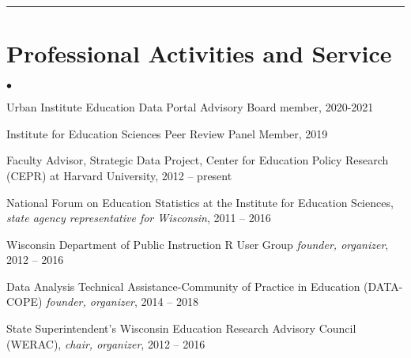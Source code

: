 \documentclass[margin,line]{res}
\newenvironment{list2}{
  \begin{list}{$\bullet$}{%
      \setlength{\itemsep}{0in}
      \setlength{\parsep}{0in} \setlength{\parskip}{0in}
      \setlength{\topsep}{0in} \setlength{\partopsep}{0in} 
      \setlength{\leftmargin}{0.2in}}}{\end{list}}
\begin{document}
\begin{resume}
% 
% 
% 
% 
% 
% 

\vspace*{1mm}
\noindent\hfil\rule{0.7\textwidth}{.4pt}\hfil
\vspace*{1mm}

\section{\sc Professional Activities and Service}
% 
\begin{list2}
\item Urban Institute Education Data Portal Advisory Board member, 2020-2021
\item Institute for Education Sciences Peer Review Panel Member, 2019
\item Faculty Advisor, Strategic Data Project, Center for Education Policy Research (CEPR) at Harvard University, 2012 -- present
\item National Forum on Education Statistics at the Institute for Education Sciences, \emph{state agency representative for Wisconsin}, 2011 -- 2016
\item Wisconsin Department of Public Instruction R User Group \emph{founder, organizer}, 
2012 -- 2016 
\item Data Analysis Technical Assistance-Community of Practice in Education 
(DATA-COPE) \emph{founder, organizer}, 2014 -- 2018
\item State Superintendent's Wisconsin Education Research Advisory Council (WERAC), 
\emph{chair, organizer}, 2012 -- 2016
\end{list2}


\end{resume}
\end{document}
